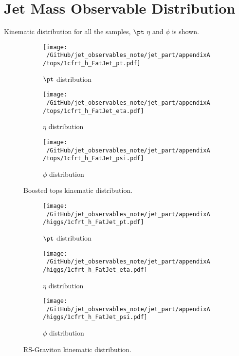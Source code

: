 
\chapter{Jet Mass Observable Distribution}
\label{appendixA}
Kinematic distribution for all the samples, $\pt$ $\eta$ and $\phi$ is shown.

\begin{figure}
    \centering
    \begin{subfigure}[b]{0.45\textwidth}
        \texttt{[image: ~/GitHub/jet\_observables\_note/jet\_part/appendixA/tops/1cfrt\_h\_FatJet\_pt.pdf]}
        \caption{$\pt$ distribution}
        \label{fig:gull}
    \end{subfigure}
    \begin{subfigure}[b]{0.45\textwidth}
        \texttt{[image: ~/GitHub/jet\_observables\_note/jet\_part/appendixA/tops/1cfrt\_h\_FatJet\_eta.pdf]}
        \caption{$\eta$ distribution}
        \label{fig:tiger}
    \end{subfigure}
    \begin{subfigure}[b]{0.45\textwidth}
        \texttt{[image: ~/GitHub/jet\_observables\_note/jet\_part/appendixA/tops/1cfrt\_h\_FatJet\_psi.pdf]}
        \caption{$\phi$ distribution}
        \label{fig:mouse}
    \end{subfigure}
    \caption{Boosted tops kinematic distribution.}\label{fig:animals}
\end{figure}


\begin{figure}
    \centering
    \begin{subfigure}[b]{0.45\textwidth}
        \texttt{[image: ~/GitHub/jet\_observables\_note/jet\_part/appendixA/higgs/1cfrt\_h\_FatJet\_pt.pdf]}
        \caption{$\pt$ distribution}
        \label{fig:gull}
    \end{subfigure}
    \begin{subfigure}[b]{0.45\textwidth}
        \texttt{[image: ~/GitHub/jet\_observables\_note/jet\_part/appendixA/higgs/1cfrt\_h\_FatJet\_eta.pdf]}
        \caption{$\eta$ distribution}
        \label{fig:tiger}
    \end{subfigure}
    \begin{subfigure}[b]{0.45\textwidth}
        \texttt{[image: ~/GitHub/jet\_observables\_note/jet\_part/appendixA/higgs/1cfrt\_h\_FatJet\_psi.pdf]}
        \caption{$\phi$ distribution}
        \label{fig:mouse}
    \end{subfigure}
    \caption{RS-Graviton kinematic distribution.}\label{fig:animals}
\end{figure}

